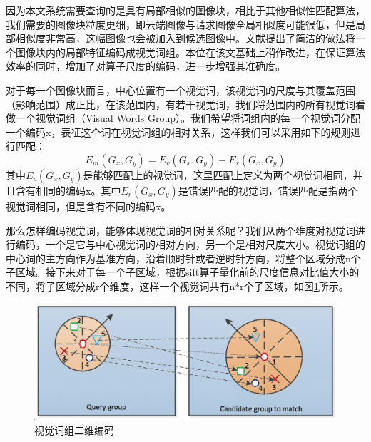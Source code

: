 因为本文系统需要查询的是具有局部相似的图像块，相比于其他相似性匹配算法，我们需要的图像块粒度更细，即云端图像与请求图像全局相似度可能很低，但是局部相似度非常高，这幅图像也会被加入到候选图像中。文献\cite{Dai:2012vn}提出了简洁的做法将一个图像块内的局部特征编码成视觉词组。本位在该文基础上稍作改进，在保证算法效率的同时，增加了对算子尺度的编码，进一步增强其准确度。

对于每一个图像块而言，中心位置有一个视觉词，该视觉词的尺度与其覆盖范围（影响范围）成正比，在该范围内，有若干视觉词，我们将范围内的所有视觉词看做一个视觉词组（Visual Words Group）。我们希望将词组内的每一个视觉词分配一个编码x，表征这个词在视觉词组的相对关系，这样我们可以采用如下的规则进行匹配：
\begin{equation}
E_m(G_x,G_y) = E_v(G_x,G_y) - E_r(G_x,G_y)
\end{equation}
其中\(E_v(G_x,G_y)\)是能够匹配上的视觉词，这里匹配上定义为两个视觉词相同，并且含有相同的编码x。其中\(E_r(G_x,G_y)\)是错误匹配的视觉词，错误匹配是指两个视觉词相同，但是含有不同的编码x。

那么怎样编码视觉词，能够体现视觉词的相对关系呢？我们从两个维度对视觉词进行编码，一个是它与中心视觉词的相对方向，另一个是相对尺度大小。视觉词组的中心词的主方向作为基准方向，沿着顺时针或者逆时针方向，将整个区域分成n个子区域。接下来对于每一个子区域，根据sift算子量化前的尺度信息对比值大小的不同，将子区域分成r个维度，这样一个视觉词共有n*r个子区域，如图\ref{fig:visual_group}所示。

\begin{figure}
\centering\includegraphics[width=15.00cm]{imgs/ch3/visual_group}
\caption{视觉词组二维编码}
\label{fig:visual_group}
\end{figure}


\ifx\usechapbib\empty
\nocite{BSTcontrol}


\fi